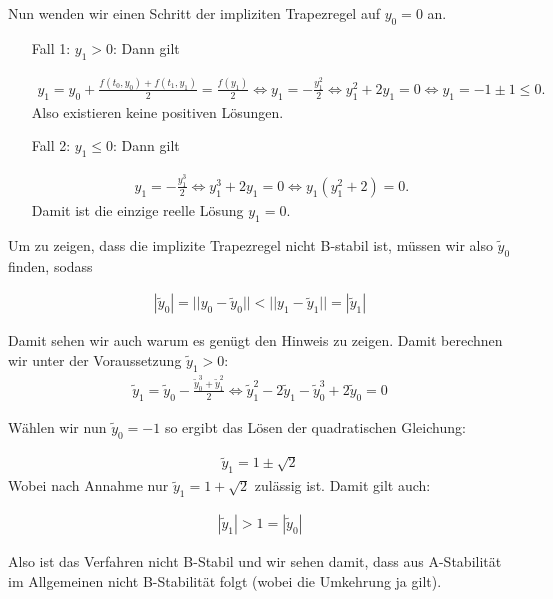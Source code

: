 \begin{solution}
\begin{itemize}
    Nun wenden wir einen Schritt der impliziten Trapezregel auf $y_0 = 0$ an.
    \begin{itemize}
      \item[Fall 1: $y_1 > 0$:] Dann gilt

        \begin{align*}
          y_1 = y_0 + \frac{f(t_0,y_0) + f(t_1,y_1)}{2} = \frac{f(y_1)}{2} \Leftrightarrow y_1 = -\frac{y_1^2}{2}
          \Leftrightarrow y_1^2 + 2y_1 = 0 \Leftrightarrow y_1 = -1 \pm 1 \leq 0.
        \end{align*}
        Also existieren keine positiven Lösungen.
      \item[Fall 2: $y_1 \leq 0$:] Dann gilt

      \begin{align*}
        y_1 = - \frac{y_1^3}{2} \Leftrightarrow y_1^3 +2y_1 = 0 \Leftrightarrow
        y_1(y_1^2+2)=0.
      \end{align*}
      Damit ist die einzige reelle Lösung $y_1 = 0$.
    \end{itemize}
    Um zu zeigen, dass die implizite Trapezregel nicht B-stabil ist, müssen wir
    also $\widetilde{y}_0$ finden, sodass

    \begin{align*}
    |\widetilde{y}_0| = ||y_0 - \widetilde{y}_0|| < ||y_1 - \widetilde{y}_1|| = |\widetilde{y}_1|
    \end{align*}

    Damit sehen wir auch warum es genügt den Hinweis zu zeigen. Damit berechnen wir
    unter der Voraussetzung $\tilde{y}_1 > 0$:
    \begin{align*}
      \tilde{y}_1 = \tilde{y}_0 - \frac{\tilde{y}_0^3 +\tilde{y}_1^2}{2} \Leftrightarrow
      \tilde{y}_1^2 - 2\tilde{y}_1 - \tilde{y}_0^3+2\tilde{y}_0 = 0
    \end{align*}

    Wählen wir nun $\tilde{y}_0 = -1$ so ergibt das Lösen der quadratischen Gleichung:

    \begin{align*}
      \tilde{y}_1 = 1 \pm \sqrt{2}
    \end{align*}
    Wobei nach Annahme nur $\tilde{y}_1 = 1+ \sqrt{2}$ zulässig ist. Damit gilt auch:

    \begin{align*}
      |\tilde{y}_1| > 1 = |\tilde{y}_0|
    \end{align*}

    Also ist das Verfahren nicht B-Stabil und wir sehen damit, dass aus A-Stabilität
    im Allgemeinen nicht B-Stabilität folgt (wobei die Umkehrung ja gilt).
 \end{itemize}
\end{solution}
